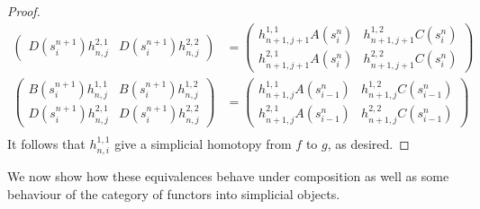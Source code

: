 \begin{proof}
\begin{align*}
\begin{pmatrix}
        D(s_i^{n+1})h_{n,j}^{2,1} & D(s_i^{n+1})h_{n,j}^{2,2} \end{pmatrix} &= \begin{pmatrix} h_{n+1,j+1}^{1,1}A(s_i^{n}) & h_{n+1,j+1}^{1,2}C(s_i^{n}) \\
        h_{n+1,j+1}^{2,1}A(s_i^{n}) & h_{n+1,j+1}^{2,2}C(s_i^{n}) \end{pmatrix} \tag{$i \leq j$} \\
        \begin{pmatrix} B(s_i^{n+1})h_{n,j}^{1,1} & B(s_i^{n+1})h_{n,j}^{1,2} \\
        D(s_i^{n+1})h_{n,j}^{2,1} & D(s_i^{n+1})h_{n,j}^{2,2} \end{pmatrix} &= \begin{pmatrix} h_{n+1,j}^{1,1}A(s_{i-1}^{n}) & h_{n+1,j}^{1,2}C(s_{i-1}^{n}) \\
        h_{n+1,j}^{2,1}A(s_{i-1}^{n}) & h_{n+1,j}^{2,2}C(s_{i-1}^{n}) \end{pmatrix} \tag{$i > j$} \\
    \end{align*}
    It follows that $h_{n,i}^{1,1}$ give a simplicial homotopy from $f$ to $g$, as desired.
\end{proof}

We now show how these equivalences behave under composition as well as some behaviour of the category of functors into simplicial objects.

